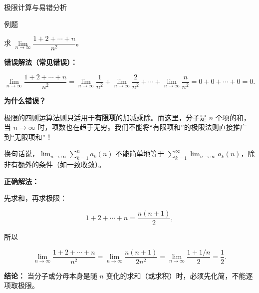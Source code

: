 \documentclass[aspectratio=169,10pt,fontset=fandol]{ctexbeamer}
\begin{document}
\begin{frame}[t,fragile]{极限计算与易错分析}
\normalsize
\begin{block}{例题}
{\normalsize


求 \(\lim\limits_{n\to\infty} \dfrac{1 + 2 + \cdots + n}{n^2}\)。



\textbf{错误解法（常见错误）：}

\[

\lim_{n\to\infty} \dfrac{1 + 2 + \cdots + n}{n^2} = \lim_{n\to\infty} \dfrac{1}{n^2} + \lim_{n\to\infty} \dfrac{2}{n^2} + \cdots + \lim_{n\to\infty} \dfrac{n}{n^2} = 0 + 0 + \cdots + 0 = 0.

\]



\textbf{为什么错误？}



极限的四则运算法则只适用于\textbf{有限项}的加减乘除。而这里，分子是 \(n\) 个项的和，当 \(n \to \infty\) 时，项数也在趋于无穷。我们不能将“有限项和”的极限法则直接推广到“无限项和”！



换句话说，\(\lim_{n\to\infty} \sum_{k=1}^{n} a_k(n)\) 不能简单地等于 \(\sum_{k=1}^{\infty} \lim_{n\to\infty} a_k(n)\)，除非有额外的条件（如一致收敛）。



\textbf{正确解法：}

先求和，再求极限：

\[

1 + 2 + \cdots + n = \dfrac{n(n+1)}{2},

\]

所以

\[

\lim_{n\to\infty} \dfrac{1 + 2 + \cdots + n}{n^2} = \lim_{n\to\infty} \dfrac{n(n+1)}{2n^2} = \lim_{n\to\infty} \dfrac{1 + 1/n}{2} = \dfrac{1}{2}.

\]



\textbf{结论：} 当分子或分母本身是随 \(n\) 变化的求和（或求积）时，必须先化简，不能逐项取极限。


}
\end{block}
\end{frame}
\end{document}
